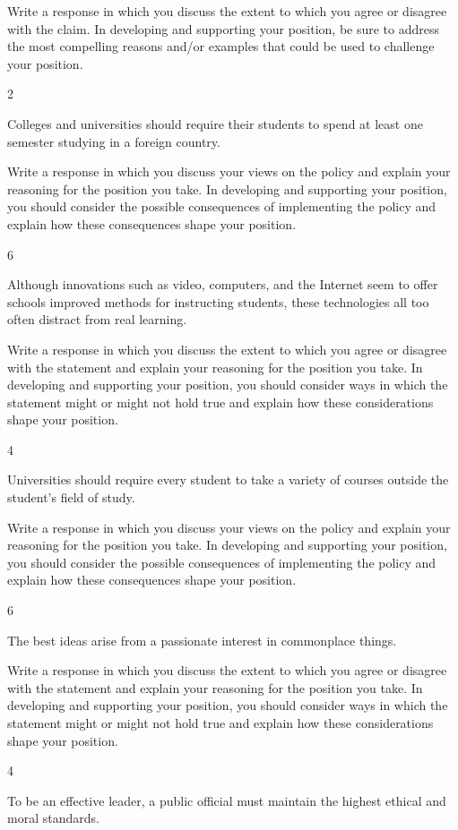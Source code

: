 \documentclass[]{article}
\begin{document}
Write a response in which you discuss the extent to which you agree or
disagree with the claim. In developing and supporting your position, be
sure to address the most compelling reasons and/or examples that could
be used to challenge your position.

2

Colleges and universities should require their students to spend at
least one semester studying in a foreign country.

Write a response in which you discuss your views on the policy and
explain your reasoning for the position you take. In developing and
supporting your position, you should consider the possible consequences
of implementing the policy and explain how these consequences shape your
position.

6

Although innovations such as video, computers, and the Internet seem to
offer schools improved methods for instructing students, these
technologies all too often distract from real learning.

Write a response in which you discuss the extent to which you agree or
disagree with the statement and explain your reasoning for the position
you take. In developing and supporting your position, you should
consider ways in which the statement might or might not hold true and
explain how these considerations shape your position.

4

Universities should require every student to take a variety of courses
outside the student's field of study.

Write a response in which you discuss your views on the policy and
explain your reasoning for the position you take. In developing and
supporting your position, you should consider the possible consequences
of implementing the policy and explain how these consequences shape your
position.

6

The best ideas arise from a passionate interest in commonplace things.

Write a response in which you discuss the extent to which you agree or
disagree with the statement and explain your reasoning for the position
you take. In developing and supporting your position, you should
consider ways in which the statement might or might not hold true and
explain how these considerations shape your position.

4

To be an effective leader, a public official must maintain the highest
ethical and moral standards.
\end{document}
